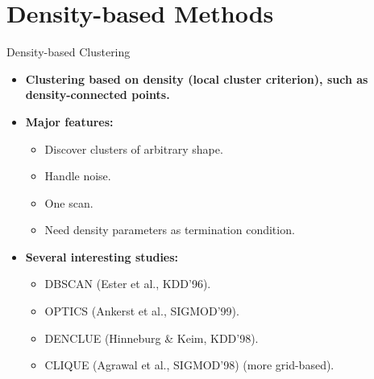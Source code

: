 \section{Density-based Methods}

\begin{frame}{Density-based Clustering}
	\begin{itemize}
		\item \textbf{Clustering based on density (local cluster criterion),
			      such as density-connected points.}
		\item \textbf{Major features:}
		      \begin{itemize}
			      \item Discover clusters of arbitrary shape.
			      \item Handle noise.
			      \item One scan.
			      \item Need density parameters as termination condition.
		      \end{itemize}
		\item \textbf{Several interesting studies:}
		      \begin{itemize}
			      \item DBSCAN (Ester et al., KDD'96).
			      \item OPTICS (Ankerst et al., SIGMOD'99).
			      \item DENCLUE (Hinneburg \& Keim, KDD'98).
			      \item CLIQUE (Agrawal et al., SIGMOD'98) (more grid-based).
		      \end{itemize}
	\end{itemize}
\end{frame}

